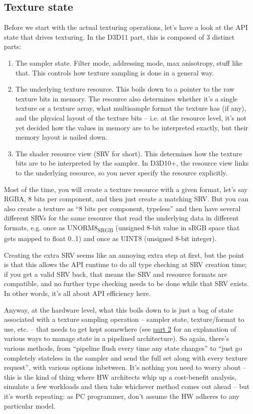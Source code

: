 \documentclass[12pt]{article}
\begin{document}
\subsection{Texture state}
\label{sec:org10e3b68}

Before we start with the actual texturing operations, let’s have a look at the API state that drives texturing. In the D3D11 part, this is composed of 3 distinct parts:

\begin{enumerate}
\item The sampler state. Filter mode, addressing mode, max anisotropy, stuff like that. This controls how texture sampling is done in a general way.
\item The underlying texture resource. This boils down to a pointer to the raw texture bits in memory. The resource also determines whether it’s a single texture or a texture array, what multisample format the texture has (if any), and the physical layout of the texture bits – i.e. at the resource level, it’s not yet decided how the values in memory are to be interpreted exactly, but their memory layout is nailed down.
\item The shader resource view (SRV for short). This determines how the texture bits are to be interpreted by the sampler. In D3D10+, the resource view links to the underlying resource, so you never specify the resource explicitly.
\end{enumerate}

Most of the time, you will create a texture resource with a given format, let’s say RGBA, 8 bits per component, and then just create a matching SRV. But you can also create a texture as “8 bits per component, typeless” and then have several different SRVs for the same resource that read the underlying data in different formats, e.g. once as UNORM8\textsubscript{SRGB} (unsigned 8-bit value in sRGB space that gets mapped to float 0..1) and once as UINT8 (unsigned 8-bit integer).

Creating the extra SRV seems like an annoying extra step at first, but the point is that this allows the API runtime to do all type checking at SRV creation time; if you get a valid SRV back, that means the SRV and resource formats are compatible, and no further type checking needs to be done while that SRV exists. In other words, it’s all about API efficiency here.

Anyway, at the hardware level, what this boils down to is just a bag of state associated with a texture sampling operation – sampler state, texture/format to use, etc. – that needs to get kept somewhere (see \hyperref[part2]{part 2} for an explanation of various ways to manage state in a pipelined architecture). So again, there’s various methods, from “pipeline flush every time any state changes” to “just go completely stateless in the sampler and send the full set along with every texture request”, with various options inbetween. It’s nothing you need to worry about – this is the kind of thing where HW architects whip up a cost-benefit analysis, simulate a few workloads and then take whichever method comes out ahead – but it’s worth repeating: as PC programmer, don’t assume the HW adheres to any particular model.
\end{document}
